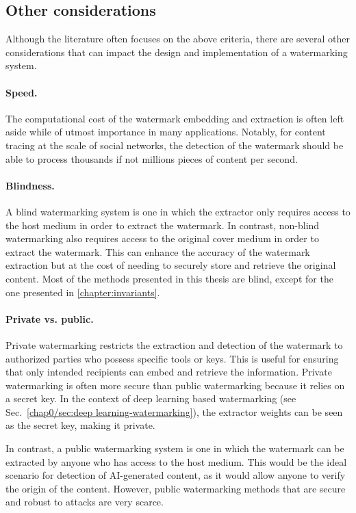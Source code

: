 \subsection{Other considerations}\label{chap0/sec:other-considerations}
Although the literature often focuses on the above criteria, there are several other considerations that can impact the design and implementation of a watermarking system.

\paragraph*{Speed.}
The computational cost of the watermark embedding and extraction is often left aside while of utmost importance in many applications.
Notably, for content tracing at the scale of social networks, the detection of the watermark should be able to process thousands if not millions pieces of content per second.

\paragraph*{Blindness.}
A blind watermarking system is one in which the extractor only requires access to the host medium in order to extract the watermark.
In contrast, non-blind watermarking also requires access to the original cover medium in order to extract the watermark. 
This can enhance the accuracy of the watermark extraction but at the cost of needing to securely store and retrieve the original content.
Most of the methods presented in this thesis are blind, except for the one presented in \autoref{chapter:invariants}.

\paragraph*{Private vs. public.}
Private watermarking restricts the extraction and detection of the watermark to authorized parties who possess specific tools or keys.
This is useful for ensuring that only intended recipients can embed and retrieve the information. 
Private watermarking is often more secure than public watermarking because it relies on a secret key.
In the context of deep learning based watermarking (see Sec.~\ref{chap0/sec:deep learning-watermarking}), the extractor weights can be seen as the secret key, making it private.

In contrast, a public watermarking system is one in which the watermark can be extracted by anyone who has access to the host medium. 
This would be the ideal scenario for detection of AI-generated content, as it would allow anyone to verify the origin of the content.
However, public watermarking methods that are secure and robust to attacks are very scarce.

